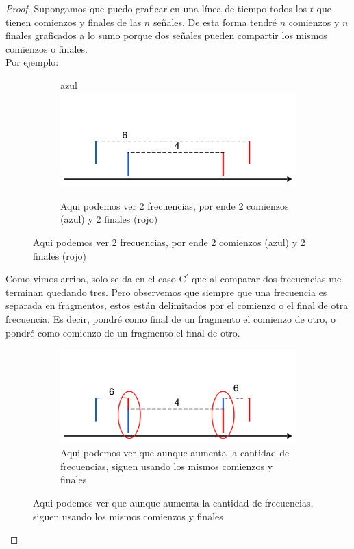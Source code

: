 \begin{proof}

Supongamos que puedo graficar en una línea de tiempo todos los $t$ que tienen comienzos y finales de las $n$ señales. De esta forma tendré $n$ comienzos y $n$ finales graficados a lo sumo porque dos señales pueden compartir los mismos comienzos o finales.\\

Por ejemplo:

            \begin{figure}[H]
        		\centering
				\begin{subfigure}[b]{0.5\textwidth}
azul                	\includegraphics[width=\textwidth]{imagenes/demo1.jpg}
                	\caption*{Aqui podemos ver 2 frecuencias, por ende 2 comienzos (azul) y 2 finales (rojo)}
        		\end{subfigure}%
			\end{figure}

Como vimos arriba, solo se da en el caso C$^{\prime}$ que al comparar dos frecuencias me terminan quedando tres. Pero observemos que siempre que una frecuencia es separada en fragmentos, estos están delimitados por el comienzo o el final de otra frecuencia. Es decir, pondré como final de un fragmento el comienzo de otro, o pondré como comienzo de un fragmento el final de otro. \\

            \begin{figure}[H]
        		\centering
				\begin{subfigure}[b]{0.5\textwidth}
                	\includegraphics[width=\textwidth]{imagenes/demo2.jpg}
                	\caption*{Aqui podemos ver que aunque aumenta la cantidad de frecuencias, siguen usando los mismos comienzos y finales}
        		\end{subfigure}%
			\end{figure}



\end{proof}
